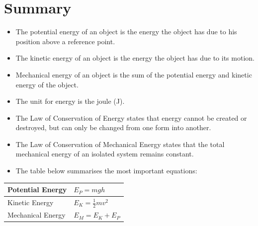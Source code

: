             \section*{Summary}
            \nopagebreak
      \label{m38786*id70947}\begin{itemize}[noitemsep]
            \label{m38786*uid111}\item The potential energy of an object is the energy the object has due to his position above a reference point.
\label{m38786*uid112}\item The kinetic energy of an object is the energy the object has due to its motion.
\label{m38786*uid113}\item Mechanical energy of an object is the sum of the potential energy and kinetic energy of the object.
\label{m38786*uid114}\item The unit for energy is the joule (J).
\label{m38786*uid115}\item The Law of Conservation of Energy states that energy cannot be created or destroyed, but can only be changed from one form into another.
\label{m38786*uid116}\item The Law of Conservation of Mechanical Energy states that the total mechanical energy of an isolated system remains constant.
\label{m38786*uid117}\item The table below summarises the most important equations:
\end{itemize}
          \begin{table}[H]
        \begin{center}
      \label{m38786*id71092}
    \noindent
      \begin{tabular}{|l|l|}\hline
        Potential Energy &
                ${E}_{P}=mgh$
             \\ \hline
        Kinetic Energy &
                ${E}_{K}=\frac{1}{2}m{v}^{2}$
              \\ \hline
        Mechanical Energy &
                ${E}_{M}={E}_{K}+{E}_{P}$
            \\ \hline
    \end{tabular}
      \end{center}
\end{table}
    \par
